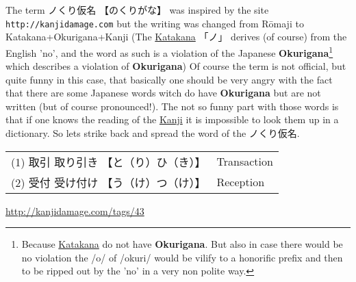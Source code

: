 The term {ノくり仮名} {【のくりがな】} was inspired by the site
\texttt{http://kanjidamage.com} but the writing was changed from Rōmaji to
Katakana+Okurigana+Kanji (The \hyperref[sec:Katakana]{Katakana} {「ノ」}
derives (of course) from the English 'no', and the word as such is a violation
of the Japanese \textbf{Okurigana}\footnote{Because
\hyperref[sec:Katakana]{Katakana} do not have \textbf{Okurigana}. But also in
case there would be no violation the /o/ of /okuri/ would be vilify to a
honorific prefix and then to be ripped out by the 'no' in a very non polite
way.} which describes a violation of \textbf{Okurigana}) Of course the term  is
not official, but quite funny in this case, that basically one should be very
angry with the fact that there are some Japanese words witch do have
\textbf{Okurigana} but are not written (but of course pronounced!).  The not so
funny part with those words is that if one knows the reading of the
\hyperref[sec:Kanji]{Kanji} it is impossible to look them up in a dictionary.
So lets strike back and spread the word of the ノくり仮名.

\begin{center}\begin{tabular}{ll}
(1) {取引} {取り引き} {【と（り）ひ（き）】} &  Transaction\\
(2) {受付} {受け付け} {【う（け）つ（け）】} &  Reception\\
\end{tabular}\end{center}


\Link \href{http://kanjidamage.com/tags/43}{http://kanjidamage.com/tags/43}








